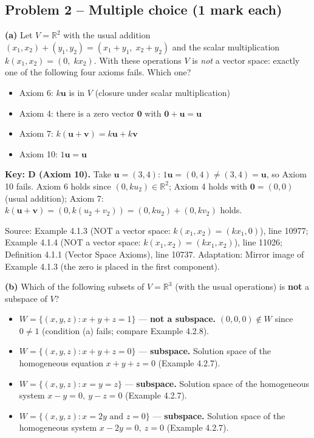 \documentclass[11pt,a4paper]{article}
\newcommand{\Src}[1]{{\footnotesize\color{black!65}Source: #1}}
\begin{document}
\subsection*{Problem 2 -- Multiple choice (1 mark each)}
\textbf{(a)} Let $V=\mathbb{R}^2$ with the usual addition $(x_1,x_2)+(y_1,y_2)=(x_1+y_1,\;x_2+y_2)$ and the scalar multiplication $k(x_1,x_2)=(0,\;kx_2)$. With these operations $V$ is \emph{not} a vector space: exactly one of the following four axioms fails. Which one?\par
\begin{itemize}[leftmargin=8mm,itemsep=0pt]\item[A] Axiom 6: $k\mathbf{u}$ is in $V$ (closure under scalar multiplication)\item[B] Axiom 4: there is a zero vector $\mathbf{0}$ with $\mathbf{0}+\mathbf{u}=\mathbf{u}$\item[C] Axiom 7: $k(\mathbf{u}+\mathbf{v})=k\mathbf{u}+k\mathbf{v}$\item[D$^{\ast}$] Axiom 10: $1\mathbf{u}=\mathbf{u}$\end{itemize}
\textbf{Key: D (Axiom 10).} Take $\mathbf{u}=(3,4)$: $1\mathbf{u}=(0,4)\neq(3,4)=\mathbf{u}$, so Axiom 10 fails. Axiom 6 holds since $(0,ku_2)\in\mathbb{R}^2$; Axiom 4 holds with $\mathbf{0}=(0,0)$ (usual addition); Axiom 7: $k(\mathbf{u}+\mathbf{v})=(0,k(u_2+v_2))=(0,ku_2)+(0,kv_2)$ holds.\par
\Src{Example 4.1.3 (NOT a vector space: $k(x_1,x_2)=(kx_1,0)$), line 10977; Example 4.1.4 (NOT a vector space: $k(x_1,x_2)=(kx_1,x_2)$), line 11026; Definition 4.1.1 (Vector Space Axioms), line 10737. Adaptation: Mirror image of Example 4.1.3 (the zero is placed in the first component).}\par
\textbf{(b)} Which of the following subsets of $V=\mathbb{R}^3$ (with the usual operations) is \textbf{not} a subspace of $V$?\par
\begin{itemize}[leftmargin=8mm,itemsep=0pt]\item[A$^{\ast}$] $W=\{(x,y,z) : x+y+z=1\}$ --- \textbf{not a subspace.} $(0,0,0)\notin W$ since $0\neq1$ (condition (a) fails; compare Example 4.2.8).\item[B] $W=\{(x,y,z) : x+y+z=0\}$ --- \textbf{subspace.} Solution space of the homogeneous equation $x+y+z=0$ (Example 4.2.7).\item[C] $W=\{(x,y,z) : x=y=z\}$ --- \textbf{subspace.} Solution space of the homogeneous system $x-y=0,\ y-z=0$ (Example 4.2.7).\item[D] $W=\{(x,y,z) : x=2y \text{ and } z=0\}$ --- \textbf{subspace.} Solution space of the homogeneous system $x-2y=0,\ z=0$ (Example 4.2.7).\end{itemize}
\end{document}
